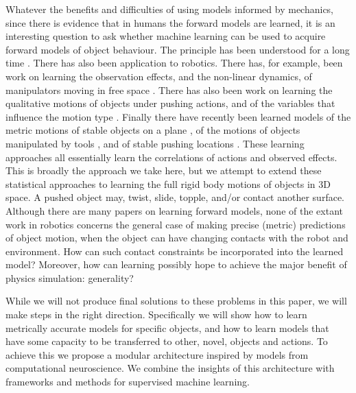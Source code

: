 Whatever the benefits and difficulties of using models informed by mechanics, since there is evidence that in humans the forward models are learned, it is an interesting question to ask whether machine learning can be used to acquire forward models of object behaviour. The principle has been understood for a long time \citep{JordanJacobs90,JordanRumelhart92}. There has also been application to robotics. There has, for example, been work on learning the observation effects, and the non-linear dynamics, of manipulators moving in free space \citep{Ting06,Boots14,dearden2005learning}. There has also been work on learning the qualitative motions of objects under pushing actions, and of the variables that influence the motion type \citep{montesano08,moldovan12,hermans11,fitzpatrick_learning_2003,ridge2010self,kroemer2014}. Finally there have recently been learned models of the metric motions of stable objects on a plane \citep{mericli2014}, of the motions of objects manipulated by tools \citep{Stoytchev_affordances_2008}, and of stable pushing locations \citep{hermans13}. These learning approaches all essentially learn the correlations of actions and observed effects. This is broadly the approach we take here, but we attempt to extend these statistical approaches to learning the full rigid body motions of objects in 3D space. A pushed object may, twist, slide, topple, and/or contact another surface. Although there are many papers on learning forward models, none of the extant work in robotics concerns the general case of making precise (metric) predictions of object motion, when the object can have changing contacts with the robot and environment. How can such contact constraints be incorporated into the learned model? Moreover, how can learning possibly hope to achieve the major benefit of physics simulation: generality? 

While we will not produce final solutions to these problems in this paper, we will make steps in the right direction. Specifically we will show how to learn metrically accurate models for specific objects, and how to learn models that have some capacity to be transferred to other, novel, objects and actions. To achieve this we propose a modular architecture inspired by models from computational neuroscience. We combine the insights of this architecture with frameworks and methods for supervised machine learning. 
